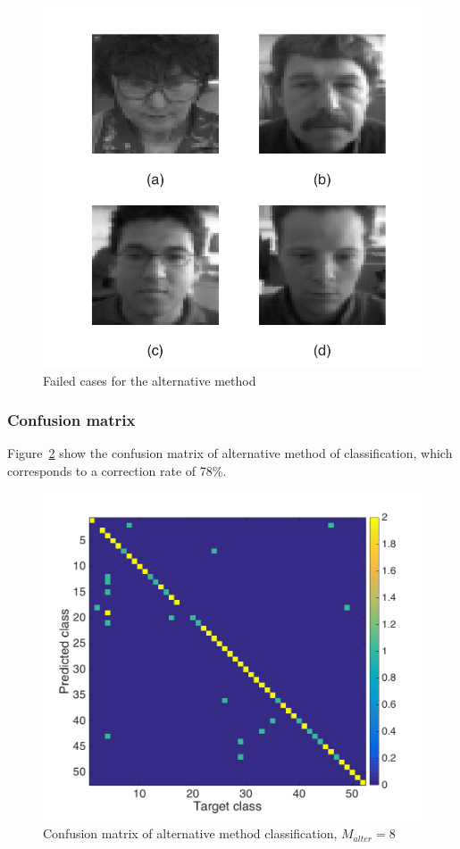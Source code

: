\documentclass[10pt,twocolumn,letterpaper]{article}
\begin{document}
	\begin{figure}
		\begin{center}
			\includegraphics[width=0.9\linewidth]{q4_fail_alter}
			\caption{Failed cases for the alternative method}
			\label{fig:q4_alter_fail}
		\end{center}
	\end{figure}

\subsubsection{Confusion matrix}
Figure~\ref{fig:q4_confmat_alter} show the confusion matrix of alternative method of classification, which corresponds to a correction rate of 78\%. \\

	\begin{figure}
		\begin{center}
			\includegraphics[width=0.9\linewidth]{confusion_matrix_alter}
			\caption{Confusion matrix of alternative method classification, $M_{alter} = 8$}
			\label{fig:q4_confmat_alter}
		\end{center}
	\end{figure}
\end{document}
